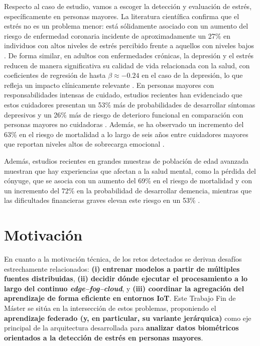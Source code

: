 \documentclass{report}
\begin{document}
Respecto al caso de estudio, vamos a escoger la detección y evaluación de estrés, específicamente en personas mayores. La literatura científica confirma que el estrés no es un problema menor: está sólidamente asociado con un aumento del riesgo de enfermedad coronaria incidente de aproximadamente un 27\% en individuos con altos niveles de estrés percibido frente a aquellos con niveles bajos \cite{Richardson2012}. De forma similar, en adultos con enfermedades crónicas, la depresión y el estrés reducen de manera significativa su calidad de vida relacionada con la salud, con coeficientes de regresión de hasta $\beta \approx -0.24$ en el caso de la depresión, lo que refleja un impacto clínicamente relevante \cite{Hwang2024}. En personas mayores con responsabilidades intensas de cuidado, estudios recientes han evidenciado que estos cuidadores presentan un 53\% más de probabilidades de desarrollar síntomas depresivos y un 26\% más de riesgo de deterioro funcional en comparación con personas mayores no cuidadoras \cite{Litzelman2021}. Además, se ha observado un incremento del 63\% en el riesgo de mortalidad a lo largo de seis años entre cuidadores mayores que reportan niveles altos de sobrecarga emocional \cite{Thomas2018}.

Además, estudios recientes en grandes muestras de población de edad avanzada muestran que hay experiencias que afectan a la salud mental, como la pérdida del cónyuge, que se asocia con un aumento del 69\% en el riesgo de mortalidad \cite{Nilaweera2023} y con un incremento del 72\% en la probabilidad de desarrollar demencia, mientras que las dificultades financieras graves elevan este riesgo en un 53\% \cite{Nilaweera2023b}.  



\section{Motivación}

En cuanto a la motivación técnica, de los retos detectados se derivan desafíos estrechamente relacionados: \textbf{(i) entrenar modelos a partir de múltiples fuentes distribuidas}, \textbf{(ii) decidir dónde ejecutar el procesamiento a lo largo del continuo \textit{edge--fog--cloud}}, y \textbf{(iii) coordinar la agregación del aprendizaje de forma eficiente en entornos IoT}. Este Trabajo Fin de Máster se sitúa en la intersección de estos problemas, proponiendo el \textbf{aprendizaje federado (y, en particular, su variante jerárquica)} como eje principal de la arquitectura desarrollada para \textbf{analizar datos biométricos orientados a la detección de estrés en personas mayores}.
\end{document}
